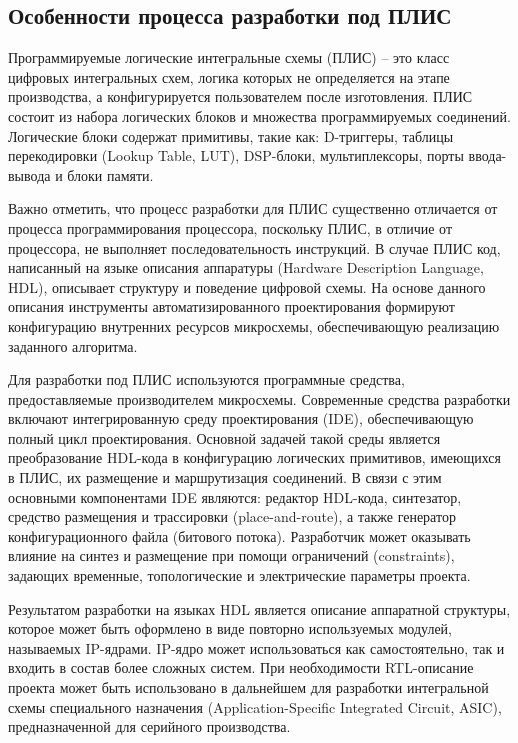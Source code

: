 \subsection{Особенности процесса разработки под ПЛИС}

Программируемые логические интегральные схемы (ПЛИС) -- это класс цифровых интегральных схем, логика которых не определяется на этапе производства, а конфигурируется пользователем после изготовления. ПЛИС состоит из набора логических блоков и множества программируемых соединений. Логические блоки содержат примитивы, такие как: D-триггеры, таблицы перекодировки (Lookup Table, LUT), DSP-блоки, мультиплексоры, порты ввода-вывода и блоки памяти. 

Важно отметить, что процесс разработки для ПЛИС существенно отличается от процесса программирования процессора, поскольку ПЛИС, в отличие от процессора, не выполняет последовательность инструкций. В случае ПЛИС код, написанный на языке описания аппаратуры (Hardware Description Language, HDL), описывает структуру и поведение цифровой схемы. На основе данного описания инструменты автоматизированного проектирования формируют конфигурацию внутренних ресурсов микросхемы, обеспечивающую реализацию заданного алгоритма.

Для разработки под ПЛИС используются программные средства, предоставляемые производителем микросхемы. Современные средства разработки включают интегрированную среду проектирования (IDE), обеспечивающую полный цикл проектирования. Основной задачей такой среды является преобразование HDL-кода в конфигурацию логических примитивов, имеющихся в ПЛИС, их размещение и маршрутизация соединений. В связи с этим основными компонентами IDE являются: редактор HDL-кода, синтезатор, средство размещения и трассировки (place-and-route), а также генератор конфигурационного файла (битового потока). Разработчик может оказывать влияние на синтез и размещение при помощи ограничений (constraints), задающих временные, топологические и электрические параметры проекта.

Результатом разработки на языках HDL является описание аппаратной структуры, которое может быть оформлено в виде повторно используемых модулей, называемых IP-ядрами. IP-ядро может использоваться как самостоятельно, так и входить в состав более сложных систем. При необходимости RTL-описание проекта может быть использовано в дальнейшем для разработки интегральной схемы специального назначения (Application-Specific Integrated Circuit, ASIC), предназначенной для серийного производства.


